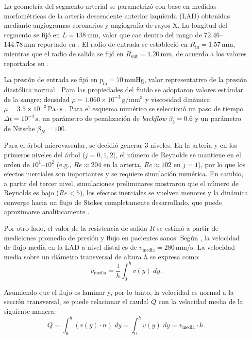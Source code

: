 \documentclass[12pt, letterpaper]{article}
\begin{document}
La geometría del segmento arterial se parametrizó con base en medidas morfométricas de la arteria descendente anterior izquierda (LAD) obtenidas mediante angiogramas coronarios y angiografía de rayos X. La longitud del segmento se fijó en $L = 138\,\text{mm}$, valor que cae dentro del rango de $72.46$--$144.78\,\text{mm}$ reportado en \cite{lad_length}. El radio de entrada se estableció en $R_{\mathrm{in}} = 1.57\,\text{mm}$, mientras que el radio de salida se fijó en $R_{\mathrm{out}} = 1.20\,\text{mm}$, de acuerdo a los valores reportados en \cite{lad_diameter}.

La presión de entrada se fijó en $p_{\mathrm{in}} = 70\,\mathrm{mmHg}$, valor representativo de la presión diastólica normal \cite{blood_pressure_aha}. Para las propiedades del fluido se adoptaron valores estándar de la sangre: densidad $\rho = 1.060\times10^{-3}\,\mathrm{g/mm^3}$ y viscosidad dinámica $\mu = 3.5\times10^{-3}\,\mathrm{Pa\cdot s}$ \cite{ku_blood_1997}. Para el esquema numérico se seleccionó un paso de tiempo $\Delta t = 10^{-4}\,\mathrm{s}$, un parámetro de penalización de \textit{backflow} $\beta_b = 0.6$ y un parámetro de Nitsche $\beta_N = 100$.

Para el árbol microvascular, se decidió generar $3$ niveles. En la arteria y en los primeros niveles del árbol ($j=0,1,2$), el número de Reynolds se mantiene en el orden de $10^1$--$10^2$ (e.g., $Re \approx 204$ en la arteria, $Re \approx 102$ en $j=1$), por lo que los efectos inerciales son importantes y se requiere simulación numérica. En cambio, a partir del tercer nivel, simulaciones preliminares mostraron que el número de Reynolds es bajo ($Re < 5$), los efectos inerciales se vuelven menores y la dinámica converge hacia un flujo de Stokes completamente desarrollado, que puede aproximarse analíticamente \cite{mcdonalds_fisiology, outflow_resistance}.

Por otro lado, el valor de la resistencia de salida $R$ se estimó a partir de mediciones promedio de presión y flujo en pacientes sanos. Según \cite{velocity_lad}, la velocidad de flujo media en la LAD a nivel distal es de $v_{\mathrm{media}} = 280\,\mathrm{mm/s}$. La velocidad media sobre un diámetro transversal de altura $h$ se expresa como:
\begin{equation*}
  v_{\mathrm{media}} = \frac{1}{h} \int_0^h v(y) \; dy.
\end{equation*}

Asumiendo que el flujo es laminar y, por lo tanto, la velocidad es normal a la sección transversal, se puede relacionar el caudal $Q$ con la velocidad media de la siguiente manera:
\begin{equation}
  Q = \int_0^h (v(y) \cdot n) \; dy = \int_0^h v(y) \; dy = v_{\mathrm{media}} \cdot h.
\end{equation}
\end{document}
